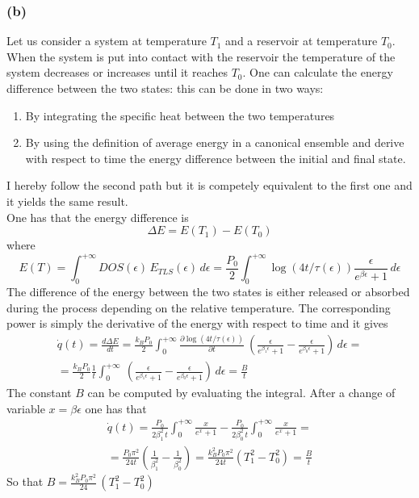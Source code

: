 \documentclass{article}
\begin{document}
\subsubsection*{(b)}
Let us consider a system at temperature $T_1$ and a reservoir at temperature $T_0$. When the system is put into contact
with the reservoir the temperature of the system decreases or increases until it reaches $T_0$. One can calculate the energy difference between the two states: this can be done in two ways:
\begin{enumerate}
    \item By integrating the specific heat between the two temperatures
    \item By using the definition of average energy in a canonical ensemble and derive with respect to time the energy difference between the initial and final state.
\end{enumerate}
I hereby follow the second path but it is competely equivalent to the first one and it yields the same result. \\
One has that the energy difference is
\begin{equation*}
    \Delta E = E(T_1) - E(T_0)
\end{equation*}
where 
\begin{equation*}
    E(T) = \int_0^{+\infty} DOS(\epsilon) \, E_{TLS}(\epsilon) \, d\epsilon = 
    \frac{P_0}{2}\int_0^{+\infty} \log(4t/\tau(\epsilon)) \frac{\epsilon }{e^{\beta\epsilon}+1} \, d\epsilon
\end{equation*}
The difference of the energy between the two states is either released or absorbed during the process depending on the relative temperature. The corresponding power is simply the derivative of
the energy with respect to time and it gives 
\begin{gather*}
    \dot q(t) = \frac{d \Delta E}{dt} = 
    \frac{k_BP_0}{2} \int_0^{+\infty} \frac{\partial \log(4t/\tau(\epsilon))}{\partial t} \ \left(\frac{\epsilon}{e^{\beta_1\epsilon} + 1} - \frac{\epsilon}{e^{\beta_0\epsilon} + 1} \right)\, d\epsilon = \\
    = \frac{k_BP_0}{2} \frac{1}{t} \int_0^{+\infty} \ \left(\frac{\epsilon}{e^{\beta_1\epsilon} + 1} - \frac{\epsilon}{e^{\beta_0\epsilon} + 1} \right) \, d\epsilon = \frac{B}{t} 
\end{gather*}
The constant $B$ can be computed by evaluating the integral. After a change of variable $x = \beta\epsilon$ one has that
\begin{gather*}
    \dot q(t) = \frac{P_0}{2\beta_1^2 \, t} \int_0^{+\infty} \frac{x}{e^x + 1} - \frac{P_0}{2\beta_0^2 \, t} \int_0^{+\infty} \frac{x}{e^x + 1} = \\
    = \frac{P_0\pi^2}{24t} \left(\frac{1}{\beta_1^2} - \frac{1}{\beta_0^2}\right) = 
    \frac{k_B^2P_0\pi^2}{24t} \left(T_1^2 - T_0^2\right) = \frac{B}{t}
\end{gather*} 
So that $B = \frac{k_B^2 P_0 \pi^2}{24} \, (T_1^2 - T_0^2)$
\end{document}
